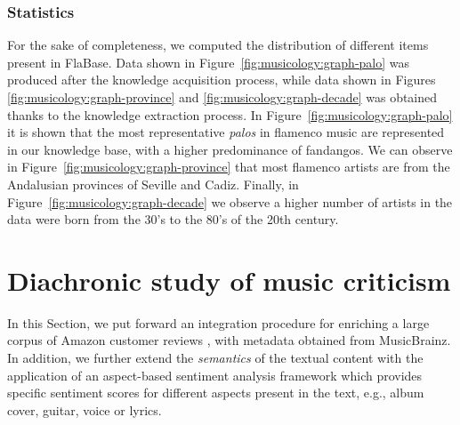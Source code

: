 \subsubsection{Statistics}
\label{sec:musicology:statistics}

For the sake of completeness, we computed the distribution of different items present in FlaBase. 
Data shown in Figure~\ref{fig:musicology:graph-palo} was produced after the knowledge acquisition process, while data shown in Figures \ref{fig:musicology:graph-province} and \ref{fig:musicology:graph-decade} was obtained thanks to the knowledge extraction process. In Figure~\ref{fig:musicology:graph-palo} it is shown that the most representative \textit{palos} in flamenco music are represented in our knowledge base, with a higher predominance of fandangos. We can observe in Figure~\ref{fig:musicology:graph-province} that most flamenco artists are from the Andalusian provinces of Seville and Cadiz. 
Finally, in Figure~\ref{fig:musicology:graph-decade} we observe a higher number of artists in the data were born from the 30's to the 80's of the 20th century.



\section{Diachronic study of music criticism}
\label{sec:musicology:evolution}

In this Section, we put forward an integration procedure for enriching a large corpus of Amazon customer reviews \citep{McAuley2015a,mcauley2015image}, with metadata obtained from MusicBrainz. %
In addition, we further extend the \textit{semantics} of the textual content with the application of an aspect-based sentiment analysis framework \citep{DongSOS13} which provides specific sentiment scores for different aspects present in the text, e.g., album cover, guitar, voice or lyrics.

